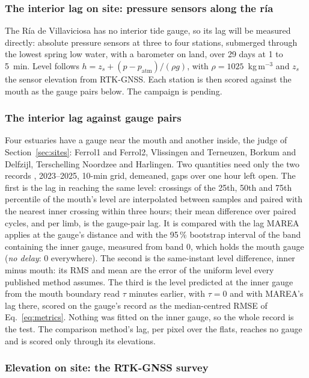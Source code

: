 \subsubsection{The interior lag on site: pressure sensors along the r\'ia}

The R\'ia de Villaviciosa has no interior tide gauge, so its lag will be
measured directly: absolute pressure sensors at three to four stations,
submerged through the lowest spring low water, with a barometer on land,
over 29 days at 1 to 5~min. Level follows
$h = z_s + (p - p_{\mathrm{atm}})/(\rho g)$, with $\rho = 1025$~kg\,m$^{-3}$
and $z_s$ the sensor elevation from RTK-GNSS. Each station is then
scored against the mouth as the gauge pairs below. The campaign is
pending.

\subsubsection{The interior lag against gauge pairs}

Four estuaries have a gauge near the mouth and another inside, the judge
of Section~\ref{sec:sites}: Ferrol1 and Ferrol2, Vlissingen and
Terneuzen, Borkum and Delfzijl, Terschelling Noordzee and Harlingen. Two quantities need
only the two records \cite{ioc2026}, 2023--2025, 10-min grid, demeaned,
gaps over one hour left open. The first is the lag in reaching the same
level: crossings of the 25th, 50th and 75th percentile of the mouth's
level are interpolated between samples and paired with the nearest inner
crossing within three hours; their mean difference over paired cycles,
and per limb, is the gauge-pair lag. It is compared with the lag MAREA
applies at the gauge's distance and with the 95\,\% bootstrap interval of
the band containing the inner gauge, measured from band 0, which holds
the mouth gauge (\emph{no delay}: 0 everywhere). The second is the
same-instant level difference, inner minus mouth: its RMS and mean are
the error of the uniform level every published method assumes. The third
is the level predicted at the inner gauge from the mouth boundary read
$\tau$ minutes earlier, with $\tau = 0$ and with MAREA's lag there,
scored on the gauge's record as the median-centred RMSE of
Eq.~\eqref{eq:metrics}. Nothing was fitted on the inner gauge, so the
whole record is the test. The comparison method's lag, per pixel over
the flats, reaches no gauge and is scored only through its elevations.

\subsubsection{Elevation on site: the RTK-GNSS survey}

